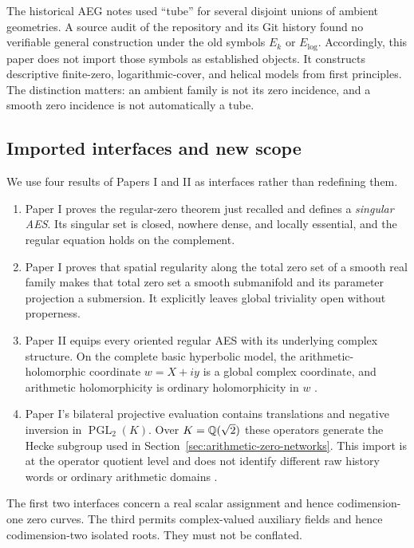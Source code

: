 The historical AEG notes used ``tube'' for several disjoint unions of ambient
geometries.  A source audit of the repository and its Git history found no
verifiable general construction under the old symbols $E_k$ or $E_{\log}$.
Accordingly, this paper does not import those symbols as established objects.
It constructs descriptive finite-zero, logarithmic-cover, and helical models from
first principles.  The distinction matters: an ambient family is not its zero
incidence, and a smooth zero incidence is not automatically a tube.

\subsection{Imported interfaces and new scope}

We use four results of Papers I and II as interfaces rather than redefining them.

\begin{enumerate}
\item Paper I proves the regular-zero theorem just recalled and defines a
  \emph{singular AES}.  Its singular set is closed, nowhere dense, and locally
  essential, and the regular equation holds on the complement.
\item Paper I proves that spatial regularity along the total zero set of a smooth
  real family makes that total zero set a smooth submanifold and its parameter
  projection a submersion.  It explicitly leaves global triviality open without
  properness.
\item Paper II equips every oriented regular AES with its underlying complex
  structure.  On the complete basic hyperbolic model, the arithmetic-holomorphic
  coordinate $w=X+iy$ is a global complex coordinate, and arithmetic
  holomorphicity is ordinary holomorphicity in $w$
  \cite{Yuan2026AEGFunctionTheory}.
\item Paper I's bilateral projective evaluation contains translations and negative
  inversion in $\operatorname{PGL}_2(K)$.  Over $K=\mathbb{Q}(\sqrt2)$ these operators
  generate the Hecke subgroup used in
  Section~\ref{sec:arithmetic-zero-networks}.  This import is at the operator
  quotient level and does not identify different raw history words or ordinary
  arithmetic domains \cite{Yuan2026AEGFoundations}.
\end{enumerate}

The first two interfaces concern a real scalar assignment and hence codimension-one
zero curves.  The third permits complex-valued auxiliary fields and hence
codimension-two isolated roots.  They must not be conflated.

